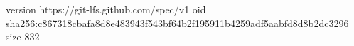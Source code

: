 version https://git-lfs.github.com/spec/v1
oid sha256:c867318cbafa8d8e483943f543bf64b2f195911b4259adf5aabfd8d8b2dc3296
size 832
